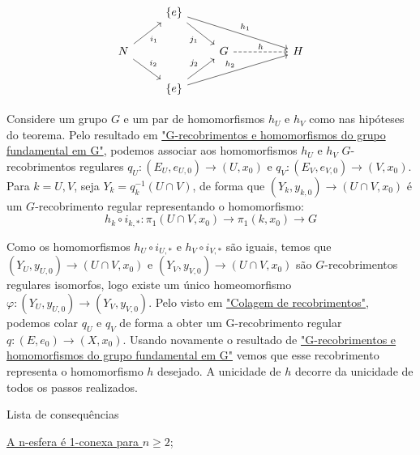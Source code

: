 \[\begin{tikzcd}
	& {\{e\}} \\
	N && G && H \\
	& {\{e\}}
	\arrow["{j_1}"', from=1-2, to=2-3]
	\arrow["{h_1}", from=1-2, to=2-5]
	\arrow["{i_1}"', from=2-1, to=1-2]
	\arrow["{i_2}", from=2-1, to=3-2]
	\arrow["h", dashed, from=2-3, to=2-5]
	\arrow["{j_2}", from=3-2, to=2-3]
	\arrow["{h_2}", from=3-2, to=2-5]
\end{tikzcd}\]

\begin{dem}
    Considere um grupo $G$ e um par de homomorfismos $h_U$ e $h_V$ como nas hipóteses do teorema. Pelo resultado em \hyperref[homomorfismos-e-g-recobrimentos-prop]{"G-recobrimentos e homomorfismos do grupo fundamental em G"}, podemos associar aos homomorfismos $h_U$ e $h_V$ $G$-recobrimentos regulares $q_U:(E_U,e_{U, 0}) \longrightarrow (U, x_0)$ e $q_V:(E_V,e_{V, 0}) \longrightarrow (V, x_0)$. Para $k = U, V$, seja $Y_k = q_k^{-1}(U \cap V)$, de forma que $(Y_k, y_{k, 0}) \longrightarrow (U \cap V, x_0)$ é um $G$-recobrimento regular representando o homomorfismo: $$h_k \circ i_{k, *}:  \pi_1(U \cap V, x_0) \longrightarrow \pi_1(k, x_0) \longrightarrow G$$

    Como os homomorfismos $h_U \circ i_{U, *}$ e $h_V \circ i_{V, *}$ são iguais, temos que $(Y_U, y_{U, 0}) \longrightarrow (U \cap V, x_0)$ e $(Y_V, y_{V, 0}) \longrightarrow (U \cap V, x_0)$ são $G$-recobrimentos regulares isomorfos, logo existe um único homeomorfismo $\varphi: (Y_U, y_{U, 0}) \longrightarrow (Y_V, y_{V, 0})$. Pelo visto em \hyperref[colagem-de-recobrimentos-prop]{"Colagem de recobrimentos"}, podemos colar $q_U$ e $q_V$ de forma a obter um G-recobrimento regular $q:(E, e_0) \longrightarrow (X, x_0)$. Usando novamente o resultado de \hyperref[homomorfismos-e-g-recobrimentos-prop]{"G-recobrimentos e homomorfismos do grupo fundamental em G"} vemos que esse recobrimento representa o homomorfismo $h$ desejado. A unicidade de $h$ decorre da unicidade de todos os passos realizados.
\end{dem}

\begin{titlemize}{Lista de consequências}
	\item \hyperref[n-esfera-1-conexa-ex]{A n-esfera é 1-conexa para $n \geq 2$};
\end{titlemize}
